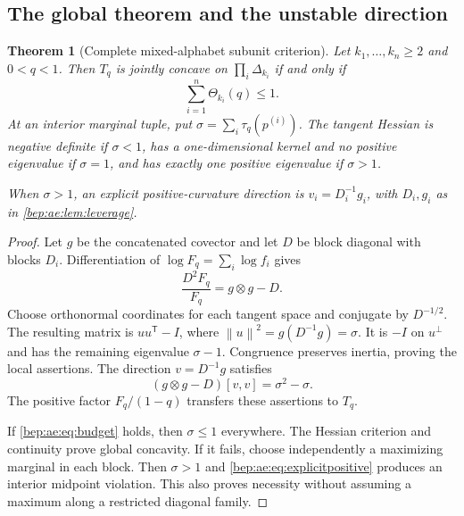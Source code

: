 \documentclass[11pt]{article}
\numberwithin{equation}{section}
\newtheorem{theorem}{Theorem}[section]
\theoremstyle{definition}
\theoremstyle{remark}
\newcommand{\norm}[1]{\left\lVert#1\right\rVert}
\begin{document}
\subsection{The global theorem and the unstable direction}
\begin{theorem}[Complete mixed-alphabet subunit criterion]\label{bep:ae:thm:subunit}
Let $k_1,\ldots,k_n\geq2$ and $0<q<1$. Then $T_q$ is jointly concave on
$\prod_i\Delta_{k_i}$ if and only if
\begin{equation}\label{bep:ae:eq:budget}
 \sum_{i=1}^n\Theta_{k_i}(q)\leq1.
\end{equation}
At an interior marginal tuple, put $\sigma=\sum_i\tau_q(p^{(i)})$.
The tangent Hessian is negative definite if $\sigma<1$, has a
one-dimensional kernel and no positive eigenvalue if $\sigma=1$, and
has exactly one positive eigenvalue if $\sigma>1$.

When $\sigma>1$, an explicit positive-curvature direction is
$v_i=D_i^{-1}g_i$, with $D_i,g_i$ as in \cref{bep:ae:lem:leverage}.
\end{theorem}
\begin{proof}
Let $g$ be the concatenated covector and let $D$ be block diagonal with
blocks $D_i$. Differentiation of $\log F_q=\sum_i\log f_i$ gives
\begin{equation}\label{bep:ae:eq:producthessian}
 \frac{D^2F_q}{F_q}=g\otimes g-D.
\end{equation}
Choose orthonormal coordinates for each tangent space and conjugate by
$D^{-1/2}$. The resulting matrix is $uu^{\mathsf T}-I$, where
$\norm{u}^2=g(D^{-1}g)=\sigma$. It is $-I$ on $u^\perp$ and has the
remaining eigenvalue $\sigma-1$. Congruence preserves inertia, proving
the local assertions. The direction $v=D^{-1}g$ satisfies
\begin{equation}\label{bep:ae:eq:explicitpositive}
 (g\otimes g-D)[v,v]=\sigma^2-\sigma.
\end{equation}
The positive factor $F_q/(1-q)$ transfers these assertions to $T_q$.

If \eqref{bep:ae:eq:budget} holds, then $\sigma\leq1$ everywhere. The Hessian
criterion and continuity prove global concavity. If it fails, choose
independently a maximizing marginal in each block. Then $\sigma>1$ and
\eqref{bep:ae:eq:explicitpositive} produces an interior midpoint violation.
This also proves necessity without assuming a maximum along a
restricted diagonal family.
\end{proof}
\end{document}
